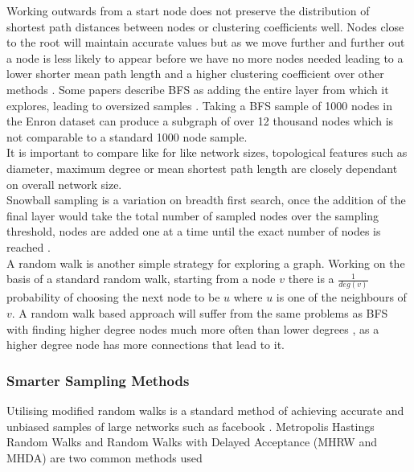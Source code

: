 \documentclass{article}
\begin{document}
Working outwards from a start node does not preserve the distribution of shortest path distances between nodes or clustering coefficients well.
Nodes close to the root will maintain accurate values but as we move further and further out a node is less likely to appear before we have no more nodes needed leading to a lower shorter mean path length and a higher clustering coefficient over other methods \cite{gjoka2010}.
Some papers describe BFS as adding the entire layer from which it explores, leading to oversized samples \cite{franks2014learning}.
Taking a BFS sample of 1000 nodes in the Enron dataset can produce a subgraph of over 12 thousand nodes which is not comparable to a standard 1000 node sample.
\\

It is important to compare like for like network sizes, topological features such as diameter, maximum degree or mean shortest path length are closely dependant on overall network size.
\\

Snowball sampling is a variation on breadth first search,
once the addition of the final layer would take the total number of sampled nodes over the sampling threshold, nodes are added one at a time until the exact number of nodes is reached \cite{franks2014learning}.
\\

A random walk is another simple strategy for exploring a graph.
Working on the basis of a standard random walk, starting from a node $v$ there is a $\frac{1}{deg(v)}$ probability of choosing the next node to be $u$ where $u$ is one of the neighbours of $v$.
A random walk based approach will suffer from the same problems as BFS with finding higher degree nodes much more often than lower degrees \cite{gjoka2010}, as a higher degree node has more connections that lead to it.

\subsubsection{Smarter Sampling Methods}
Utilising modified random walks is a standard method of achieving accurate and unbiased samples of large networks such as facebook \cite{gjoka2010}.
Metropolis Hastings Random Walks and Random Walks with Delayed Acceptance (MHRW and MHDA) are two common methods used \cite{gjoka2010, gjoka11practicalreco}
\end{document}

